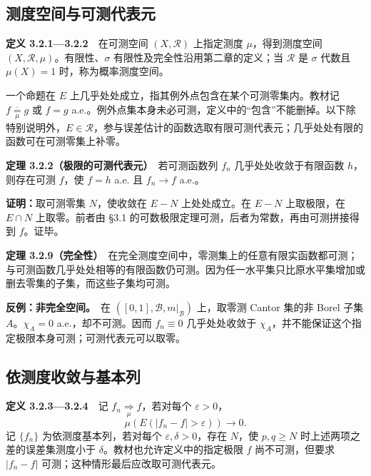 \documentclass[11pt,a4paper]{article}
\begin{document}
\subsection*{测度空间与可测代表元}\label{ux6d4bux5ea6ux7a7aux95f4ux4e0eux53efux6d4bux4ee3ux8868ux5143}

\textbf{定义 3.2.1---3.2.2}　在可测空间 \((X,\mathcal R)\) 上指定测度
\(\mu\)，得到测度空间 \((X,\mathcal R,\mu)\)。有限性、\(\sigma\)
有限性及完全性沿用第二章的定义；当 \(\mathcal R\) 是 \(\sigma\) 代数且
\(\mu(X)=1\) 时，称为概率测度空间。

一个命题在 \(E\) 上几乎处处成立，指其例外点包含在某个可测零集内。教材记
\(f\underset{\mu}{\overset{\cdot}{=}}g\) 或 \(f=g\)
a.e.。例外点集本身未必可测，定义中的``包含''不能删掉。以下除特别说明外，\(E\in\mathcal R\)，参与误差估计的函数选取有限可测代表元；几乎处处有限的函数可在可测零集上补零。

\textbf{定理 3.2.2（极限的可测代表元）}　若可测函数列 \(f_n\)
几乎处处收敛于有限函数 \(h\)，则存在可测 \(f\)，使 \(f=h\) a.e. 且
\(f_n\to f\) a.e.。

\textbf{证明：}取可测零集 \(N\)，使收敛在 \(E-N\) 上处处成立。在 \(E-N\)
上取极限，在 \(E\cap N\) 上取零。前者由 §3.1
的可数极限定理可测，后者为常数，再由可测拼接得到 \(f\)。证毕。

\textbf{定理
3.2.9（完全性）}　在完全测度空间中，零测集上的任意有限实函数都可测；与可测函数几乎处处相等的有限函数仍可测。因为任一水平集只比原水平集增加或删去零集的子集，而这些子集均可测。

\textbf{反例：非完全空间。}　在 \(([0,1],\mathcal B,m|_{\mathcal B})\)
上，取零测 Cantor 集的非 Borel 子集 \(A\)。\(\chi_A=0\)
a.e.，却不可测。因而 \(f_n\equiv0\) 几乎处处收敛于
\(\chi_A\)，并不能保证这个指定极限本身可测；可测代表元可以取零。

\subsection*{依测度收敛与基本列}\label{ux4f9dux6d4bux5ea6ux6536ux655bux4e0eux57faux672cux5217}

\textbf{定义 3.2.3---3.2.4}　记
\(f_n\underset{\mu}{\Rightarrow}f\)，若对每个 \(\varepsilon>0\)， \[
\mu(E(|f_n-f|>\varepsilon))\longrightarrow0.
\] 记 \(\{f_n\}\) 为依测度基本列，若对每个
\(\varepsilon,\delta>0\)，存在 \(N\)，使 \(p,q\ge N\)
时上述两项之差的误差集测度小于 \(\delta\)。教材也允许定义中的指定极限
\(f\) 尚不可测，但要求 \(|f_n-f|\) 可测；这种情形最后应改取可测代表元。
\end{document}
